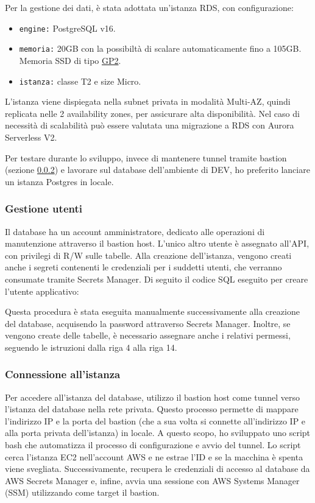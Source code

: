Per la gestione dei dati, è stata adottata un'istanza RDS, con configurazione: 
\begin{itemize}
    \item \texttt{engine:} PostgreSQL v16.
    \item \texttt{memoria:} 20GB con la possibiltà di scalare automaticamente fino a 105GB. Memoria SSD di tipo \href{https://docs.aws.amazon.com/AmazonRDS/latest/UserGuide/CHAP_Storage.html#Concepts.Storage.GeneralSSD}{GP2}.
    \item \texttt{istanza:} classe T2 e size Micro.
\end{itemize}
L’istanza viene dispiegata nella subnet privata in modalità Multi-AZ, quindi replicata nelle 2 availability zones, per assicurare alta disponibilità. Nel caso di necessità di scalabilità può essere valutata una migrazione a RDS con Aurora Serverless V2.

Per testare durante lo sviluppo, invece di mantenere tunnel tramite bastion (sezione \ref{sub:connessione_db}) e lavorare sul database dell'ambiente di DEV, ho preferito lanciare un istanza Postgres in locale.

\subsubsection{Gestione utenti}
Il database ha un account amministratore, dedicato alle operazioni di manutenzione attraverso il bastion host. L’unico altro utente è assegnato all’API, con privilegi di R/W sulle tabelle. 
Alla creazione dell’istanza, vengono creati anche i segreti contenenti le credenziali per i suddetti utenti, che verranno consumate tramite Secrets Manager.
Di seguito il codice SQL eseguito per creare l'utente applicativo:



Questa procedura è stata eseguita manualmente successivamente alla creazione del database, acquisendo la password attraverso Secrets Manager. Inoltre, se vengono create delle tabelle, è necessario assegnare anche i relativi permessi, seguendo le istruzioni dalla riga 4 alla riga 14. 

\subsubsection{Connessione all'istanza}
\label{sub:connessione_db}
Per accedere all'istanza del database, utilizzo il bastion host come tunnel verso l'istanza del database nella rete privata. Questo processo permette di mappare l'indirizzo IP e la porta del bastion (che a sua volta si connette all'indirizzo IP e alla porta privata dell'istanza) in locale. A questo scopo, ho sviluppato uno script bash che automatizza il processo di configurazione e avvio del tunnel. Lo script cerca l'istanza EC2 nell'account AWS e ne estrae l'ID e se la macchina è spenta viene svegliata. Successivamente, recupera le credenziali di accesso al database da AWS Secrets Manager e, infine, avvia una sessione con AWS Systems Manager (SSM) utilizzando come target il bastion.

